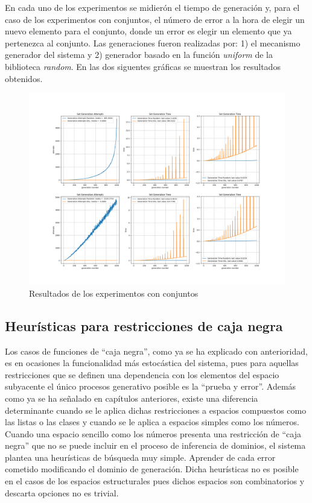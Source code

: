 En cada uno de los experimentos se midierón el tiempo de generación y, para el caso de los experimentos
con conjuntos, el número de error a la hora de elegir un nuevo elemento para el conjunto, donde un error
es elegir un elemento que ya pertenezca al conjunto. Las generaciones fueron realizadas por: 1) el
mecanismo generador del sistema y 2) generador basado en la función {\it uniform} de la biblioteca {\it random}.
En las dos siguentes gráficas se muestran los resultados obtenidos.

\begin{figure}[H]
      \includegraphics[width=\linewidth]{Graphics/exp3.png}
      \caption{Resultados de los experimentos con conjuntos}
      \label{fig:exp_3}
\end{figure}



\subsection*{Heurísticas para restricciones de caja negra}

Los casos de funciones de “caja negra”, como ya se ha explicado con anterioridad, es en ocasiones la
funcionalidad más estocástica del sistema, pues para aquellas restricciones que se definen una dependencia
con los elementos del espacio subyacente el único procesos generativo posible es la “prueba y error”.
Además como ya se ha señalado en capítulos anteriores, existe una diferencia determinante cuando se le
aplica dichas restricciones a espacios compuestos como las listas o las clases y cuando se le aplica a
espacios simples como los números. Cuando una espacio sencillo como los números presenta una restricción
de “caja negra” que no se puede incluir en el proceso de inferencia de dominios, el sistema plantea una
heurísticas de búsqueda muy simple. Aprender de cada error cometido modificando el dominio de generación.
Dicha heurísticas no es posible en el casos de los espacios estructurales pues dichos espacios son
combinatorios y descarta opciones no es trivial.

